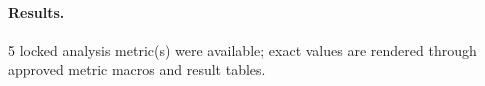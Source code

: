 \paragraph{Results.} 5 locked analysis metric(s) were available; exact values are rendered through approved metric macros and result tables.

